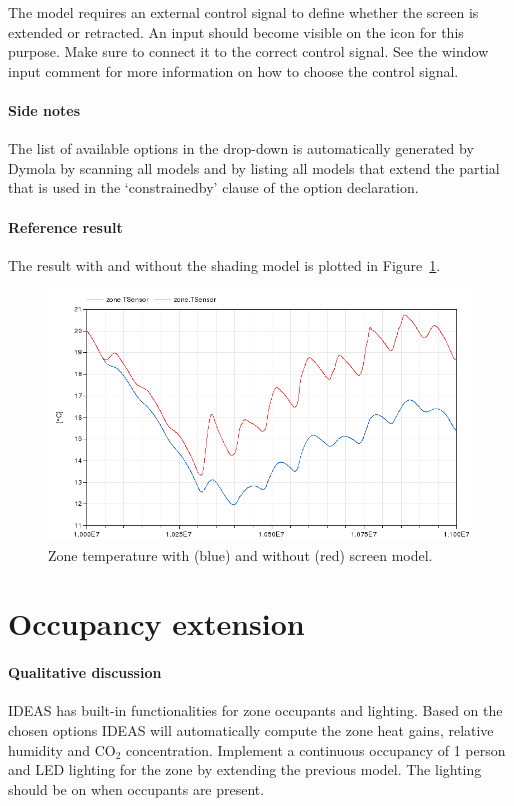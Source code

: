 \documentclass[10pt,a4paper]{article}
\begin{document}
The  model requires an external control signal to define
whether the screen is extended or retracted. 
An input should become visible on the  icon for this
purpose. Make sure to connect it to the correct control signal.
See the window input comment for more information on how
to choose the control signal.

\paragraph{Side notes}
The list of available options in the drop-down is automatically generated by
Dymola by scanning all models and by listing all models that extend the partial
that is used in the `constrainedby' clause of the option declaration.


\paragraph{Reference result}
The result with and without the shading model
is plotted in Figure~\ref{fig:res2}.

\begin{figure}
\centering
\includegraphics[scale=0.7]{Example2.png}
\caption{Zone temperature with (blue) and without (red) screen model.}
\label{fig:res2}
\end{figure}


\section{Occupancy extension}
\paragraph{Qualitative discussion}
IDEAS has built-in functionalities for zone occupants and lighting.
Based on the chosen options IDEAS will automatically compute
the zone heat gains, relative humidity and CO$_2$ concentration.
Implement a continuous occupancy of 1 person and LED
lighting for the zone by extending the previous model.
The lighting should be on when occupants are present.
\end{document}
